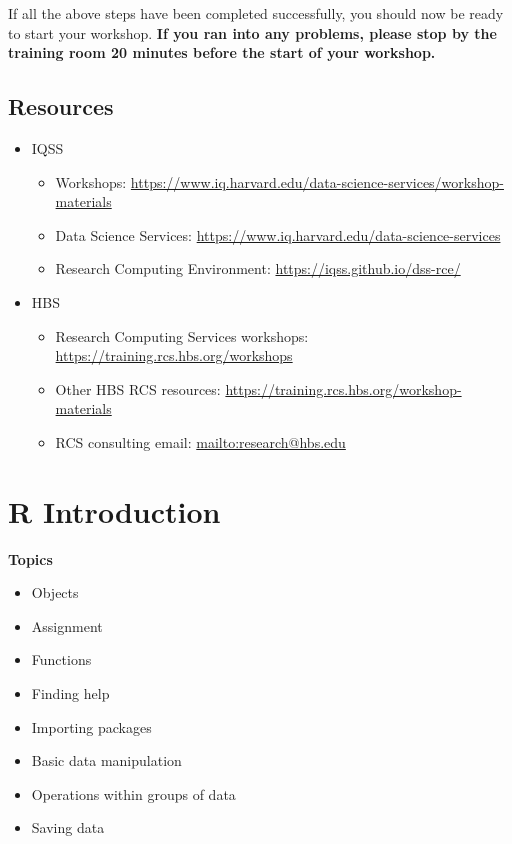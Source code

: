 \documentclass[
]{book}
\providecommand{\tightlist}{%
  \setlength{\itemsep}{0pt}\setlength{\parskip}{0pt}}
\begin{document}
If all the above steps have been completed successfully, you should now
be ready to start your workshop. \textbf{If you ran into any problems, please
stop by the training room 20 minutes before the start of your workshop.}

\hypertarget{resources-1}{%
\section{Resources}\label{resources-1}}

\begin{itemize}
\tightlist
\item
  IQSS

  \begin{itemize}
  \tightlist
  \item
    Workshops: \url{https://www.iq.harvard.edu/data-science-services/workshop-materials}
  \item
    Data Science Services: \url{https://www.iq.harvard.edu/data-science-services}
  \item
    Research Computing Environment: \url{https://iqss.github.io/dss-rce/}
  \end{itemize}
\item
  HBS

  \begin{itemize}
  \tightlist
  \item
    Research Computing Services workshops: \url{https://training.rcs.hbs.org/workshops}
  \item
    Other HBS RCS resources: \url{https://training.rcs.hbs.org/workshop-materials}
  \item
    RCS consulting email: \url{mailto:research@hbs.edu}
  \end{itemize}
\end{itemize}

\hypertarget{r-introduction}{%
\chapter{R Introduction}\label{r-introduction}}

\textbf{Topics}

\begin{itemize}
\tightlist
\item
  Objects
\item
  Assignment
\item
  Functions
\item
  Finding help
\item
  Importing packages
\item
  Basic data manipulation
\item
  Operations within groups of data
\item
  Saving data
\end{itemize}
\end{document}
